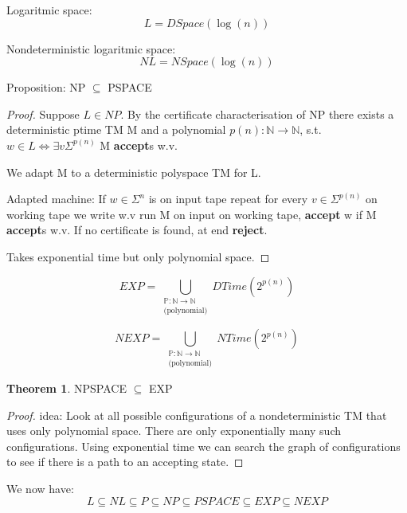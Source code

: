 \documentclass[a4paper,12pt]{article}
\theoremstyle{definition}
\newtheorem{theorem}[counter]{Theorem}
\theoremstyle{remark}
\newcommand{\N}{\mathbb{N}}
\newcommand{\Pp}{\mathbb{P}}
\begin{document}
Logaritmic space:
\begin{equation*}
    L = DSpace(\log(n))
\end{equation*}

Nondeterministic logaritmic space:
\begin{equation*}
    NL = NSpace(\log(n))
\end{equation*}


Proposition: NP $\subseteq$ PSPACE

\begin{proof}
    Suppose $L \in NP$. By the certificate characterisation of NP there exists a deterministic ptime TM M
    and a polynomial $p(n): \N \to \N$, s.t. $w \in L \iff \exists v \Sigma^{p(n)}$ M \textbf{accept}s w.v.

    We adapt M to a deterministic polyspace TM for L.

    Adapted machine:
    If $w \in \Sigma^n$ is on input tape repeat for every $v \in \Sigma^{p(n)}$ on working tape we write w.v run M on input on working tape, \textbf{accept} 
    w if M \textbf{accept}s w.v. If no certificate is found, at end \textbf{reject}.

    Takes exponential time but only polynomial space.
\end{proof}

\begin{equation*}
    EXP = \bigcup_{\substack{\Pp: \N \to \N \\ \text{(polynomial)}}} DTime(2^{p(n)})
\end{equation*}

\begin{equation*}
    NEXP = \bigcup_{\substack{\Pp: \N \to \N \\ \text{(polynomial)}}} NTime(2^{p(n)})
\end{equation*}


\begin{theorem}
    NPSPACE $\subseteq$ EXP
\end{theorem}

\begin{proof}
    idea: Look at all possible configurations of a nondeterministic TM that uses only polynomial space.
    There are only exponentially many such configurations. Using exponential time we can search the graph of configurations to see
    if there is a path to an accepting state.
\end{proof}

We now have:
\begin{equation*}
    L \subseteq NL \subseteq P \subseteq NP \subseteq PSPACE \subseteq EXP \subseteq NEXP
\end{equation*}
\end{document}
